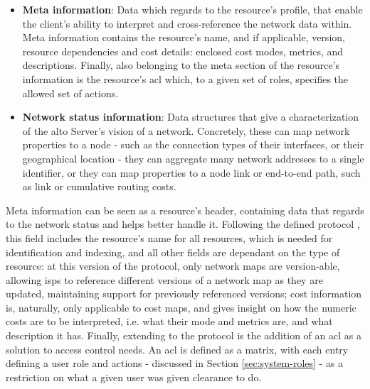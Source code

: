 
\begin{itemize}
        \item \textbf{Meta information}: Data which regards to the resource's profile, that enable the client's ability to interpret and cross-reference the network data within.
            Meta information contains the resource's name, and if applicable, version, resource dependencies and cost details: enclosed cost modes, metrics, and descriptions.
            Finally, also belonging to the meta section of the resource's information is the resource's \gls{acl} which, to a given set of roles, specifies the allowed set of actions.

        \item \textbf{Network status information}: Data structures that give a characterization of the \gls{alto} Server's vision of a network.
            Concretely, these can map network properties to a node - such as the connection types of their interfaces, or their geographical location - they can aggregate many network addresses to a single identifier, or they can map properties to a node link or end-to-end path, such as link or cumulative routing costs.
\end{itemize}

    Meta information can be seen as a resource's header, containing data that regards to the network status and helps better handle it.
    Following the defined protocol \cite{alto-protocol}, this field includes the resource's name for all resources, which is needed for identification and indexing, and all other fields are dependant on the type of resource: at this version of the protocol, only network maps are version-able, allowing \glspl{isp} to reference different versions of a network map as they are updated, maintaining support for previously referenced versions; cost information is, naturally, only applicable to cost maps, and gives insight on how the numeric costs are to be interpreted, i.e. what their mode and metrics are, and what description it has.
    Finally, extending to the protocol is the addition of an \gls{acl} as a solution to access control needs.
    An \gls{acl} is defined as a matrix, with each entry defining a user role and actions - discussed in Section \ref{sec:system-roles} - as a restriction on what a given user was given clearance to do.

